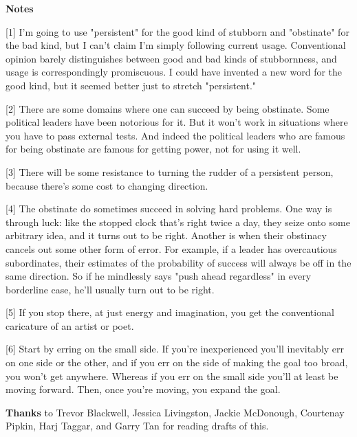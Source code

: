                   \textbf{Notes}

[1] I'm going to use "persistent" for the good kind of stubborn
                  and "obstinate" for the bad kind, but I can't claim I'm simply
                  following current usage. Conventional opinion barely
                  distinguishes between good and bad kinds of stubbornness, and
                  usage is correspondingly promiscuous. I could have invented a
                  new word for the good kind, but it seemed better just to
                  stretch "persistent."

[2] There are some domains where one can succeed by being
                  obstinate. Some political leaders have been notorious for it.
                  But it won't work in situations where you have to pass
                  external tests. And indeed the political leaders who are
                  famous for being obstinate are famous for getting power, not
                  for using it well.

[3] There will be some resistance to turning the rudder of a
                  persistent person, because there's some cost to changing
                  direction.

[4] The obstinate do sometimes succeed in solving hard
                  problems. One way is through luck: like the stopped clock
                  that's right twice a day, they seize onto some arbitrary idea,
                  and it turns out to be right. Another is when their obstinacy
                  cancels out some other form of error. For example, if a leader
                  has overcautious subordinates, their estimates of the
                  probability of success will always be off in the same
                  direction. So if he mindlessly says "push ahead regardless" in
                  every borderline case, he'll usually turn out to be right.

[5] If you stop there, at just energy and imagination, you get
                  the conventional caricature of an artist or poet.

[6] Start by erring on the small side. If you're inexperienced
                  you'll inevitably err on one side or the other, and if you err
                  on the side of making the goal too broad, you won't get
                  anywhere. Whereas if you err on the small side you'll at least
                  be moving forward. Then, once you're moving, you expand the
                  goal.



\textbf{Thanks} to Trevor Blackwell, Jessica Livingston,
                    Jackie McDonough, Courtenay Pipkin, Harj Taggar, and Garry
                    Tan for reading drafts of this.


              
            
          
          
            
              
                


                  
              
            
          
        

